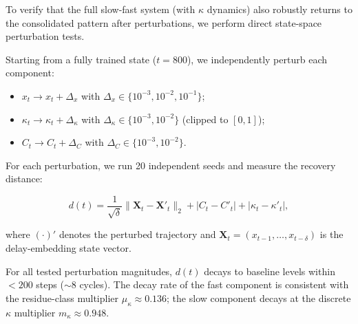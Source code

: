 \documentclass[12pt,a4paper]{article}
\begin{document}
To verify that the full slow-fast system (with $\kappa$ dynamics) also robustly returns to the consolidated pattern after perturbations, we perform direct state-space perturbation tests.



Starting from a fully trained state ($t=800$), we independently perturb each component:

\begin{itemize}

  \item $x_t \to x_t + \Delta_x$ with $\Delta_x \in \{10^{-3}, 10^{-2}, 10^{-1}\}$;

  \item $\kappa_t \to \kappa_t + \Delta_\kappa$ with $\Delta_\kappa \in \{10^{-3}, 10^{-2}\}$ (clipped to $[0,1]$);

  \item $C_t \to C_t + \Delta_C$ with $\Delta_C \in \{10^{-3}, 10^{-2}\}$.

\end{itemize}

For each perturbation, we run 20 independent seeds and measure the recovery distance:

\[

d(t) = \frac{1}{\sqrt{\delta}}\|\mathbf{X}_t - \mathbf{X}'_t\|_2 + |C_t - C'_t| + |\kappa_t - \kappa'_t|,

\]

where $(\cdot)'$ denotes the perturbed trajectory and $\mathbf{X}_t = (x_{t-1},\ldots,x_{t-\delta})$ is the delay-embedding state vector.



For all tested perturbation magnitudes, $d(t)$ decays to baseline levels within $<200$ steps ($\sim 8$ cycles). The decay rate of the fast component is consistent with the residue-class multiplier $\mu_\kappa\approx0.136$; the slow component decays at the discrete $\kappa$ multiplier $m_\kappa\approx0.948$.
\end{document}
